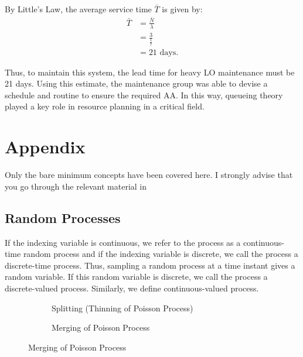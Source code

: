 \documentclass[11pt, a4paper]{report}
\begin{document}
By Little's Law, the average service time \(\bar{T}\) is given by:
\begin{align}
    \bar{T} &= \frac{\bar{N}}{\lambda} \\
    &= \frac{3}{\frac{1}{7}} \\
    &= 21 \text{ days}.
\end{align}

Thus, to maintain this system, the lead time for heavy LO maintenance must be 21 days. Using this estimate, the maintenance group was able to devise a schedule and routine to ensure the required AA. In this way, queueing theory played a key role in resource planning in a critical field.

\chapter{Appendix}
Only the bare minimum concepts have been covered here. I strongly advise that you go through the relevant material in \cite{pishro2014introduction}

\section{Random Processes}
If the indexing variable is continuous, we refer to the process as a continuous-time random process and if the indexing variable is discrete, we call the process a discrete-time process. Thus, sampling a random process at a time instant gives a random variable. If this random variable is discrete, we call the process a discrete-valued process. Similarly, we define continuous-valued process. 

\begin{figure}
    \begin{subfigure}[b]{0.45\textwidth}
        \centering
        
        \caption{Splitting (Thinning of Poisson Process)}
        \label{fig:split}
    \end{subfigure}
    \hfill
    \begin{subfigure}[b]{0.45\textwidth}
        \centering
        
        \caption{Merging of Poisson Process}
        \label{fig:merging}
    \end{subfigure}
    \label{fig:splitMerge}
\end{figure}
\end{document}
